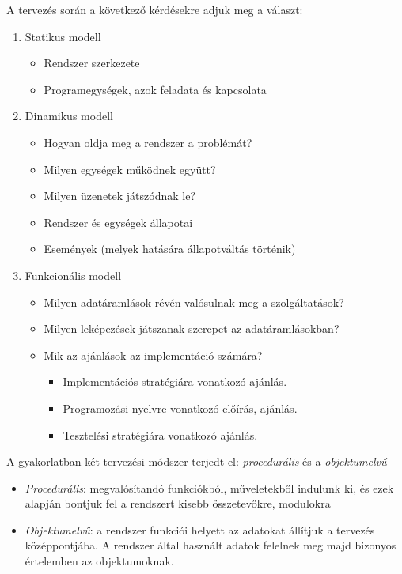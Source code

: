 \documentclass[12pt,margin=0px]{article}
\begin{document}
\begin{enumerate}
				A tervezés során a következő kérdésekre adjuk
				meg a választ:
				\begin{enumerate}
					\item Statikus modell
						\begin{itemize}
							\item Rendszer szerkezete
							\item Programegységek, azok feladata és kapcsolata
						\end{itemize}
					\item Dinamikus modell
					\begin{itemize}
						\item Hogyan oldja meg a rendszer a problémát?
						\item Milyen egységek működnek együtt?
						\item Milyen üzenetek játszódnak le?
						\item Rendszer és egységek állapotai
						\item Események (melyek hatására állapotváltás történik)
					\end{itemize}
\newpage					
					\item Funkcionális modell
					\begin{itemize}
						\item Milyen adatáramlások révén valósulnak meg a szolgáltatások?
						\item Milyen leképezések játszanak szerepet az adatáramlásokban?
						\item Mik az ajánlások az implementáció számára?
						\begin{itemize}
							\item Implementációs stratégiára vonatkozó ajánlás.
							\item Programozási nyelvre vonatkozó előírás, ajánlás.
							\item Tesztelési stratégiára vonatkozó ajánlás.
						\end{itemize}
					\end{itemize}
				\end{enumerate}
				
				A gyakorlatban két tervezési módszer terjedt el:
				\textit{procedurális} és a \textit{objektumelvű}
	\begin{itemize}
        \item \textit{Procedurális}: megvalósítandó funkciókból, műveletekből indulunk ki, és ezek alapján bontjuk fel a rendszert kisebb összetevőkre, modulokra\\
        \item \textit{Objektumelvű}: a rendszer funkciói helyett az adatokat állítjuk a tervezés középpontjába. A rendszer által használt adatok felelnek meg majd bizonyos értelemben az objektumoknak.
    \end{itemize}
			

\end{enumerate}
\end{document}
